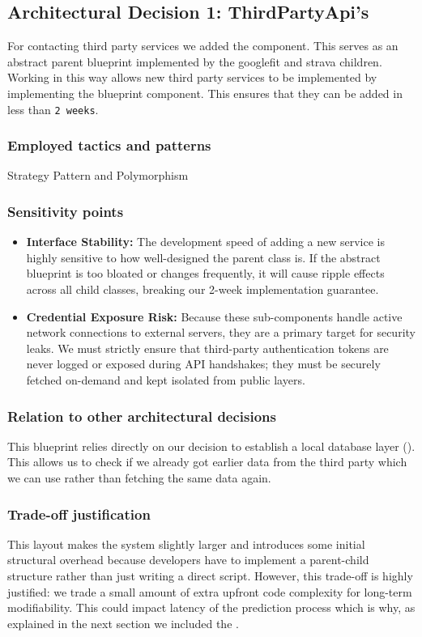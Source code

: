 \subsection*{Architectural Decision 1:
ThirdPartyApi's}

For contacting third party services we added the  component. This serves as an abstract parent blueprint implemented by the googlefit and strava children. Working in this way allows new third party services to be implemented by implementing the blueprint component. This ensures that they can be added in less than \texttt{2 weeks}.

\subsubsection*{Employed tactics and patterns}
Strategy Pattern and Polymorphism

\subsubsection*{Sensitivity points}
\begin{itemize}
	\item \textbf{Interface Stability:} The development speed of adding a new service is highly sensitive to how well-designed the parent class is. If the abstract blueprint is too bloated or changes frequently, it will cause ripple effects across all child classes, breaking our 2-week implementation guarantee.
	\item \textbf{Credential Exposure Risk:} Because these sub-components handle active network connections to external servers, they are a primary target for security leaks. We must strictly ensure that third-party authentication tokens are never logged or exposed during API handshakes; they must be securely fetched on-demand and kept isolated from public layers.
\end{itemize}

\subsubsection*{Relation to other architectural decisions}
This blueprint relies directly on our decision to establish a local database layer (). This allows us to check if we already got earlier data from the third party which we can use rather than fetching the same data again.
\subsubsection*{Trade-off justification}
This layout makes the system slightly larger and introduces some initial structural overhead because developers have to implement a parent-child structure rather than just writing a direct script. However, this trade-off is highly justified: we trade a small amount of extra upfront code complexity for long-term modifiability.
This could impact latency of the prediction process which is why, as explained in the next section we included the .

